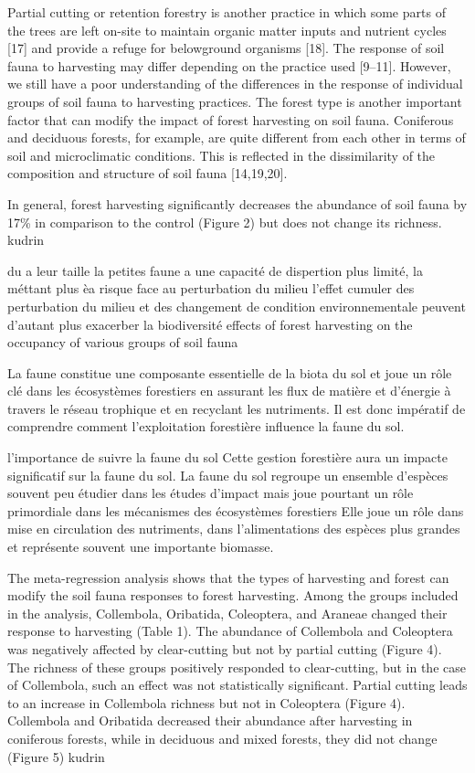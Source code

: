 Partial cutting or retention forestry is another practice in which some parts of the trees are left on-site to maintain organic matter inputs and nutrient cycles [17] and provide a refuge for belowground organisms [18]. The response of soil fauna to harvesting may differ depending on the practice used [9–11]. However, we still have a poor understanding of the differences in the response of individual groups of soil fauna to harvesting practices. The forest type is another important factor that can modify the impact of forest harvesting on soil fauna. Coniferous and deciduous forests, for example, are quite different from each other in terms of soil and microclimatic conditions. This is reflected in the dissimilarity of the composition and structure of soil fauna [14,19,20].

In general, forest harvesting significantly decreases the abundance of soil fauna by 17\% in comparison to the control (Figure 2) but does not change its richness. kudrin

du a leur taille la petites faune a une capacité de dispertion plus limité, la méttant plus èa risque face au perturbation du milieu
l'effet cumuler des perturbation du milieu et des changement de condition environnementale peuvent d'autant plus exacerber la biodiversité
 effects of forest harvesting on the occupancy of various groups of soil fauna

La faune constitue une composante essentielle de la biota du sol et joue un rôle clé dans les écosystèmes forestiers en assurant les flux de matière et d'énergie à travers le réseau trophique et en recyclant les nutriments. 
Il est donc impératif de comprendre comment l'exploitation forestière influence la faune du sol.

l'importance de suivre la faune du sol 
    Cette gestion forestière aura un impacte significatif sur la faune du sol.
    La faune du sol regroupe un ensemble d'espèces souvent peu étudier dans les études d'impact mais joue pourtant un rôle primordiale dans les mécanismes des écosystèmes forestiers
    Elle joue un rôle dans mise en circulation des nutriments, dans l'alimentations des espèces plus grandes et représente souvent une importante biomasse.

The meta-regression analysis shows that the types of harvesting and forest can modify the soil fauna responses to forest harvesting. Among the groups included in the analysis, Collembola, Oribatida, Coleoptera, and Araneae changed their response to harvesting (Table 1). The abundance of Collembola and Coleoptera was negatively affected by clear-cutting but not by partial cutting (Figure 4). The richness of these groups positively responded to clear-cutting, but in the case of Collembola, such an effect was not statistically significant. Partial cutting leads to an increase in Collembola richness but not in Coleoptera (Figure 4). Collembola and Oribatida decreased their abundance after harvesting in coniferous forests, while in deciduous and mixed forests, they did not change (Figure 5) kudrin

